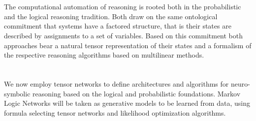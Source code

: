 \documentclass[
    final,
    paper=a4,
    pagesize=auto,
    fontsize=10pt, %
    version=last,
]{scrbook}
\begin{document}
    \listoftodos

    \frontmatter
    

    \pagestyle{scrplain}

    \cleardoublepage

    \tableofcontents

    
    
    

    \mainmatter

    \part{\partonetext}\label{par:one}

    The computational automation of reasoning is rooted both in the probabilistic and the logical reasoning tradition.
    Both draw on the same ontological commitment that systems have a factored structure, that is their states are described by assignments to a set of variables.
    Based on this commitment both approaches bear a natural tensor representation of their states and a formalism of the respective reasoning algorithms based on multilinear methods.

    
    

    
    


    \part{\parttwotext}\label{par:two}

    We now employ tensor networks to define architectures and algorithms for neuro-symbolic reasoning based on the logical and probabilistic foundations.
    Markov Logic Networks will be taken as generative models to be learned from data, using formula selecting tensor networks and likelihood optimization algorithms.

    

    
    

    

    
\end{document}
